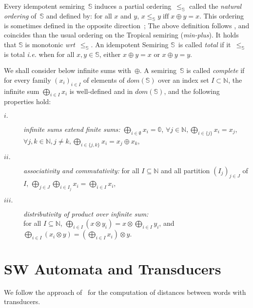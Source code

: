 \documentclass[a4paper,11pt]{article}
\def\ie{\textit{i.e.}\xspace}
\def\wrt{\textit{wrt}\xspace}
\newcommand{\Semiring}{\mathbb{S}}
\newcommand{\zero}{\mathbb{0}}
\newcommand{\dom}{\ensuremath{\mathit{dom}}}
\begin{document}
Every idempotent semiring~$\Semiring$ induces 
a partial ordering~$\leq_\Semiring$ 
called the \emph{natural ordering} of~$\Semiring$
and defined by: 
for all $x$ and $y$,
$x \leq_\Semiring y \;\mbox{iff}\; x \oplus y = x$.
This ordering is sometimes defined in the opposite direction~\cite{DrosteKuich09semirings};
The above definition follows \cite{Mohri02semiring}, 
and coincides than the usual ordering on the Tropical semiring (\emph{min-plus}).
%
It holds that $\Semiring$ is {monotonic} \wrt~$\leq_\Semiring$.
An idempotent Semiring $\Semiring$~is called \emph{total} if
it~$\leq_\Semiring$ is total
\ie when for all $x, y \in \Semiring$, either $x \oplus y = x$ or $x \oplus y = y$.

We shall consider below infinite sums with~$\oplus$.
A semiring~$\Semiring$ is called \emph{complete} 
if for every family
$(x_i)_{i \in I}$ %
of elements of $\dom(\Semiring)$ over an index set $I \subset \mathbb{N}$,
the infinite sum $\bigoplus_{i \in I} x_i$
is well-defined and in $\dom(\Semiring)$,
and the following properties hold:
\begin{description}
\item[$i.$]
\emph{infinite sums extend finite sums:}
$\displaystyle\bigoplus_{i \in \emptyset} x_i = \zero$,\quad 
      $\forall j\in \mathbb{N}, \displaystyle\bigoplus_{i \in \{ j \}} x_i = x_j$,\quad
      $\forall j, k\in \mathbb{N}, j\neq k, 
      \displaystyle\bigoplus_{i \in \{ j, k \}} x_i = x_j \oplus x_k$,
%
\item[$ii.$]
\emph{associativity and commutativity:}
for all $I \subseteq \mathbb{N}$
and all partition $(I_{j})_{j \in J}$ of $I$, %
\(
\displaystyle
\bigoplus_{j \in J}\bigoplus_{i \in I_j} x_i = 
\bigoplus_{i \in I} x_i
\),
%
\item[$iii.$] 
\emph{distributivity of product over infinite sum:}\\
for all $I \subseteq \mathbb{N}$,
\(
\displaystyle
\bigoplus_{i \in I} (x \otimes y_i) = x \otimes \bigoplus_{i\in I} y_i\), and
\(
\displaystyle
\bigoplus_{i \in I} (x_i \otimes y) = (\bigoplus_{i \in I} x_i ) \otimes y\).
\end{description}



\section{SW Automata and Transducers}
\label{section:transducer}
We follow the approach of~\cite{Mohri03EDWA} for the computation of distances
between words with transducers.
\end{document}
